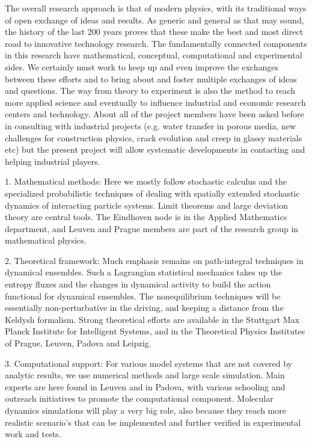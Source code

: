 The overall research approach is that of modern physics, with its traditional ways of open
exchange of ideas and results.  As generic and general as that may sound, the history of the
last 200 years proves that these make the best and most direct road to innovative technology
research.  The fundamentally connected components in this research have mathematical,
conceptual, computational and experimental sides.
%
We certainly must work to keep up and even improve the exchanges between these efforts and
to bring about and foster multiple exchanges of ideas and questions.  The way from theory to
experiment is also the method to reach more applied science and eventually to influence
industrial and economic research centers and technology.  About all of the project members
have been asked before in consulting with industrial projects (e.g. water transfer in porous
media, new challenges for construction physics, crack evolution and creep in glassy
materials etc) but the present project will allow systematic developments in contacting and
helping industrial players.


1. Mathematical methods: Here we mostly follow stochastic calculus and the specialized
probabilistic techniques of dealing with spatially extended stochastic dynamics of
interacting particle systems. Limit theorems and large deviation theory are central tools.
The Eindhoven node is in the Applied Mathematics department, and Leuven and Prague members
are part of the research group in mathematical physics.

2. Theoretical framework: Much emphasis remains on path-integral techniques in dynamical
ensembles.  Such a Lagrangian statistical mechanics takes up the entropy fluxes and the
changes in dynamical activity to build the action functional for dynamical ensembles.  The
nonequilibrium techniques will be essentially non-perturbative in the driving, and keeping a
distance from the Keldysh formalism. Strong theoretical efforts are available in the
Stuttgart Max Planck Institute for Intelligent Systems, and in the Theoretical Physics
Institutes of Prague, Leuven, Padova and Leipzig.

3. Computational support: For various model systems that are not covered by analytic results, we use numerical methods and large scale simulation.  Main experts are
here found in Leuven and in Padova, with various schooling and outreach initiatives to
promote the computational component.  Molecular dynamics simulations will play a very big role, also because they reach more realistic scenario's that can be implemented and further verified in experimental work and tests.

